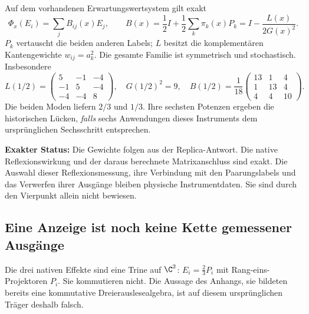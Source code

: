 Auf dem vorhandenen Erwartungswertsystem gilt exakt
\begin{equation}\label{eq:pairingtransfer}
\Phi_x(E_i)=\sum_j B_{ij}(x)E_j,\qquad
B(x)=\frac12I+\frac12\sum_k\pi_k(x)P_k
=I-\frac{L(x)}{2G(x)^2}.
\end{equation}
$P_k$ vertauscht die beiden anderen Labels; $L$ besitzt die komplementären Kantengewichte $w_{ij}=a_k^2$. Die gesamte Familie ist symmetrisch und stochastisch. Insbesondere
\begin{equation}
L(1/2)=
\begin{pmatrix}5&-1&-4\\-1&5&-4\\-4&-4&8\end{pmatrix},
\quad G(1/2)^2=9,
\quad
\boxed{B(1/2)=\frac1{18}
\begin{pmatrix}13&1&4\\1&13&4\\4&4&10\end{pmatrix}.}
\end{equation}
Die beiden Moden liefern $2/3$ und $1/3$. Ihre sechsten Potenzen ergeben die historischen Lücken, \emph{falls} sechs Anwendungen dieses Instruments dem ursprünglichen Sechsschritt entsprechen.

\textbf{Exakter Status:} Die Gewichte folgen aus der Replica-Antwort. Die native Reflexionswirkung und der daraus berechnete Matrixanschluss sind exakt. Die Auswahl dieser Reflexionsmessung, ihre Verbindung mit den Paarungslabels und das Verwerfen ihrer Ausgänge bleiben physische Instrumentdaten. Sie sind durch den Vierpunkt allein nicht bewiesen.


\subsection{Eine Anzeige ist noch keine Kette gemessener Ausgänge}
Die drei nativen Effekte sind eine Trine auf $\C^2$:
$E_i=\tfrac23 P_i$ mit Rang-eins-Projektoren $P_i$.
Sie kommutieren nicht. Die Aussage des Anhangs, sie bildeten bereits eine kommutative Dreierauslesealgebra, ist auf diesem ursprünglichen Träger deshalb falsch.

